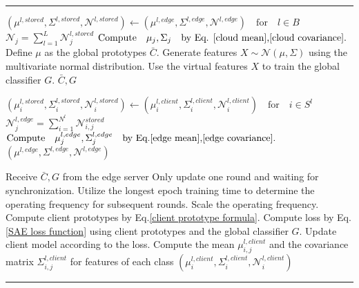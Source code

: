 \documentclass[journal]{IEEEtran}
\makeatletter
\newenvironment{breakablealgorithm}
  {%
   \begin{center}
     \refstepcounter{algorithm}%
     \hrule height.8pt depth0pt \kern2pt%
     \renewcommand{\caption}[2][\relax]{%
       {\raggedright\textbf{\ALG@name~\thealgorithm} ##2\par}%
       \ifx\relax##1\relax %
         \addcontentsline{loa}{algorithm}{\protect\numberline{\thealgorithm}##2}%
       \else %
         \addcontentsline{loa}{algorithm}{\protect\numberline{\thealgorithm}##1}%
       \fi
       \kern2pt\hrule\kern2pt
     }
  }{%
     \kern2pt\hrule\relax%
   \end{center}
  }
\makeatother
\begin{document}
\begin{breakablealgorithm}
\begin{algorithmic}[1]
    \State \( (\mu^{l,stored}, \Sigma^{l,stored},\mathcal{N}^{l,stored}) \gets (\mu^{l,edge}, \Sigma^{l,edge},\mathcal{N}^{l,edge})\quad\text{for}\quad l \in B \)
    \State \( \mathcal{N}_j = \sum_{l=1}^{L}\mathcal{N}^{l,stored}_{j} \)
    \State \( \text{Compute}\quad\mu_j,\Sigma_j\quad\text{by Eq. \ref{cloud mean},\ref{cloud covariance}}.  \)
    \EndFor
    \State Define $\mu$ as the global prototypes $\bar{C}$.
    \State Generate features \(X \sim \mathcal{N}(\mu, \Sigma)\) using the multivariate normal distribution.
    \State Use the virtual features \(X\) to train the global classifier \( G \).
    \State \Return \( \bar{C}, G \)
    \EndProcedure
    
    \State \( (\mu^{l,stored}_i, \Sigma^{l,stored}_i,\mathcal{N}^{l,stored}_i) \gets (\mu^{l,client}_i, \Sigma^{l,client}_i,\mathcal{N}^{l,client}_i)\quad\text{for}\quad i \in S^l \)
    \State \( \mathcal{N}^{l,edge}_j = \sum_{i=1}^{N^l}\mathcal{N}^{stored}_{i,j} \)
    \State \( \text{Compute}\quad\mu^{l,edge}_j,\Sigma^{l,edge}_j\quad\text{by Eq.\ref{edge mean},\ref{edge covariance}}.  \)
    \EndFor
    \State \Return \( (\mu^{l,edge}, \Sigma^{l,edge},\mathcal{N}^{l,edge}) \)
    \EndProcedure

    \State Receive \( \bar{C}, G \) from the edge server
    \State Only update one round and waiting for synchronization.
    \State Utilize the longest epoch training time to determine the operating frequency for subsequent rounds.
    \State Scale the operating frequency.
    \State Compute client prototypes by Eq.\ref{client prototype formula}.
    \State Compute loss by Eq. \ref{SAE loss function} using client prototypes and the global classifier $G$.
    \State Update client model according to the loss.
    \EndFor
    \EndFor
    \State Compute the mean $\mu^{l,client}_{i,j}$ and the covariance matrix  $\Sigma^{l,client}_{i,j}$ for features of each class 
    \State \Return \( (\mu^{l,client}_i, \Sigma^{l,client}_i,\mathcal{N}^{l,client}_i) \)
    \EndProcedure
  \end{algorithmic}
\end{breakablealgorithm}
\end{document}

